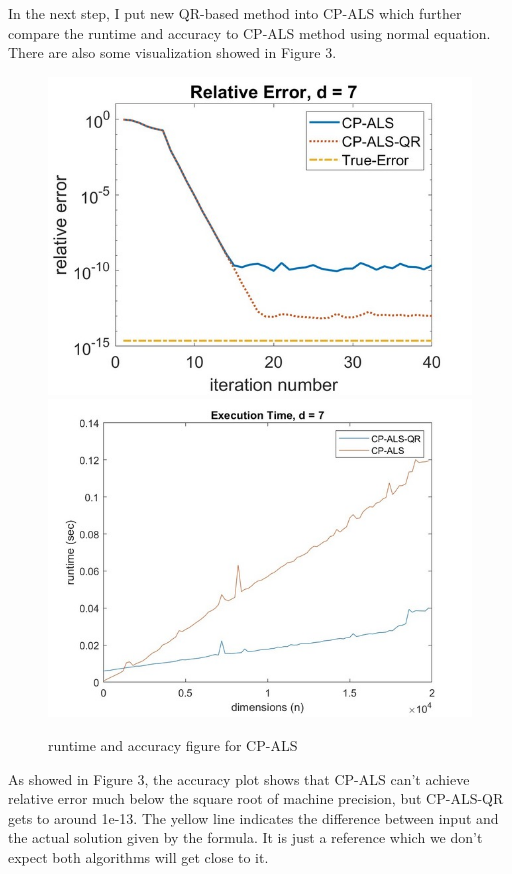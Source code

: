 \documentclass{article}
\begin{document}
In the next step, I put new QR-based method into CP-ALS which further compare the runtime and accuracy to 
CP-ALS method using normal equation. There are also some visualization showed in Figure $3$.

\begin{figure}[ht!]
  \begin{center}
    \includegraphics*[scale = 0.3]{accuracy.jpeg}
    \includegraphics*[scale = 0.3]{runtime.jpeg}
    \caption[Figure]{runtime and accuracy figure for CP-ALS}
  \end{center}
\end{figure}

As showed in Figure $3$,
the accuracy plot shows that CP-ALS can't achieve relative error much below the square root 
of machine precision, but CP-ALS-QR gets to around 1e-13. The yellow line indicates the difference
between input and the actual solution given by the formula. It is just a reference which we don't
expect both algorithms will get close to it.
\end{document}
